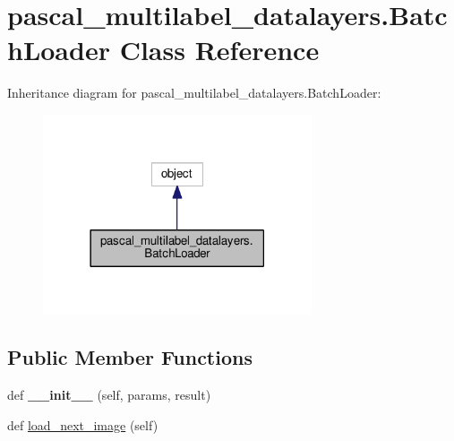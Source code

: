 \hypertarget{classpascal__multilabel__datalayers_1_1_batch_loader}{}\section{pascal\+\_\+multilabel\+\_\+datalayers.\+Batch\+Loader Class Reference}
\label{classpascal__multilabel__datalayers_1_1_batch_loader}


Inheritance diagram for pascal\+\_\+multilabel\+\_\+datalayers.\+Batch\+Loader\+:
\nopagebreak
\begin{figure}[H]
\begin{center}
\leavevmode
\includegraphics[width=225pt]{classpascal__multilabel__datalayers_1_1_batch_loader__inherit__graph}
\end{center}
\end{figure}
\subsection*{Public Member Functions}
\begin{DoxyCompactItemize}
\item 
\mbox{\label{classpascal__multilabel__datalayers_1_1_batch_loader_a900ed03309f9525f737cd33cb5ae0aa9}} 
def {\bfseries \+\_\+\+\_\+init\+\_\+\+\_\+} (self, params, result)
\item 
def \mbox{\hyperlink{classpascal__multilabel__datalayers_1_1_batch_loader_a58069173aff314092d015903b1f8c360}{load\+\_\+next\+\_\+image}} (self)
\end{DoxyCompactItemize}
